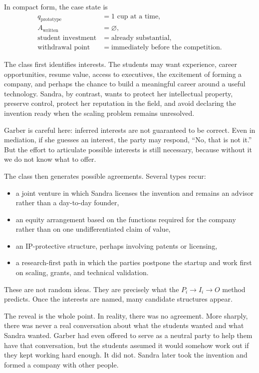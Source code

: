 In compact form, the case state is
\begin{align}
q_{\text{prototype}} &= 1 \text{ cup at a time},\\
A_{\text{written}} &= \varnothing,\\
\text{student investment} &= \text{already substantial},\\
\text{withdrawal point} &= \text{immediately before the competition}.
\end{align}

The class first identifies interests. The students may want experience, career opportunities, resume value, access to executives, the excitement of forming a company, and perhaps the chance to build a meaningful career around a useful technology. Sandra, by contrast, wants to protect her intellectual property, preserve control, protect her reputation in the field, and avoid declaring the invention ready when the scaling problem remains unresolved.

Garber is careful here: inferred interests are not guaranteed to be correct. Even in mediation, if she guesses an interest, the party may respond, ``No, that is not it.'' But the effort to articulate possible interests is still necessary, because without it we do not know what to offer.

The class then generates possible agreements. Several types recur:

\begin{itemize}
\item a joint venture in which Sandra licenses the invention and remains an advisor rather than a day-to-day founder,
\item an equity arrangement based on the functions required for the company rather than on one undifferentiated claim of value,
\item an IP-protective structure, perhaps involving patents or licensing,
\item a research-first path in which the parties postpone the startup and work first on scaling, grants, and technical validation.
\end{itemize}

These are not random ideas. They are precisely what the \(P_i \to I_i \to O\) method predicts. Once the interests are named, many candidate structures appear.

The reveal is the whole point. In reality, there was no agreement. More sharply, there was never a real conversation about what the students wanted and what Sandra wanted. Garber had even offered to serve as a neutral party to help them have that conversation, but the students assumed it would somehow work out if they kept working hard enough. It did not. Sandra later took the invention and formed a company with other people.

